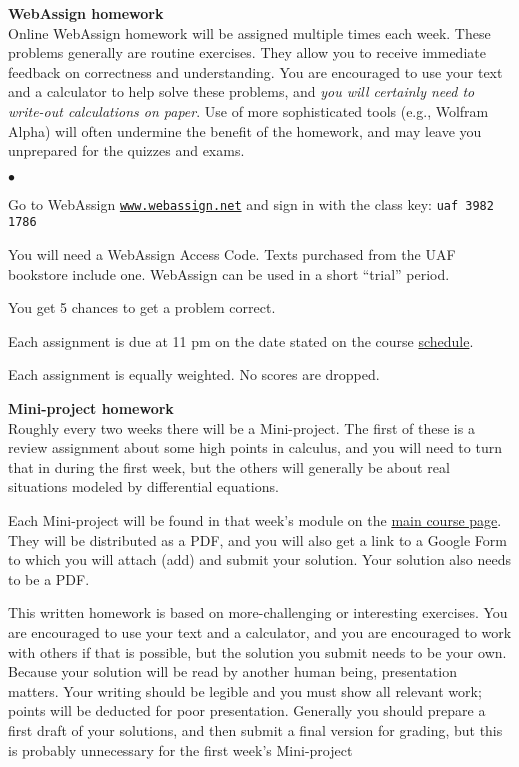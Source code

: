 \documentclass[12pt]{article}
\renewcommand{\emph}[1]{\textsf{\textbf{#1}}}
\newcommand{\localhead}[1]{\par\smallskip\textbf{#1}\nobreak\\}%
\def\subheading#1{\localhead{\emph{#1}}}
\newenvironment{clist}%
{\bgroup\parskip 0pt\begin{list}{$\bullet$}{\partopsep 4pt\topsep 0pt\itemsep -2pt}}%
{\end{list}\egroup}%
\begin{document}
\subheading{WebAssign homework} 
Online WebAssign homework will be assigned multiple times each week.  These problems generally are routine exercises.  They allow you to receive immediate feedback on correctness and understanding.  You are encouraged to use your text and a calculator to help solve these problems, and \textsl{you will certainly need to write-out calculations on paper}.  Use of more sophisticated tools (e.g., Wolfram Alpha) will often undermine the benefit of the homework, and may leave you unprepared for the quizzes and exams.

\begin{clist}
\item Go to WebAssign \href{https://www.webassign.net/}{\tt www.webassign.net} and sign in with the class key: \quad \texttt{uaf 3982 1786}
\item You will need a WebAssign Access Code.  Texts purchased from the UAF bookstore include one.  WebAssign can be used in a short ``trial'' period.
\item You get 5 chances to get a problem correct. 
\item Each assignment is due at 11 pm on the date stated on the course \href{https://bueler.github.io/math302/schedule.pdf}{schedule}. 
\item Each assignment is equally weighted. No scores are dropped.
\end{clist}

\subheading{Mini-project homework}
Roughly every two weeks there will be a Mini-project.  The first of these is a review assignment about some high points in calculus, and you will need to turn that in during the first week, but the others will generally be about real situations modeled by differential equations.

Each Mini-project will be found in that week's module on the \href{https://bueler.github.io/math302/}{main course page}.  They will be distributed as a PDF, and you will also get a link to a Google Form to which you will attach (add) and submit your solution.  Your solution also needs to be a PDF.

This written homework is based on more-challenging or interesting exercises.  You are encouraged to use your text and a calculator, and you are encouraged to work with others if that is possible, but the solution you submit needs to be your own.  Because your solution will be read by another human being, presentation matters.  Your writing should be legible and you must show all relevant work; points will be deducted for poor presentation.  Generally you should prepare a first draft of your solutions, and then submit a final version for grading, but this is probably unnecessary for the first week's Mini-project
\end{document}
